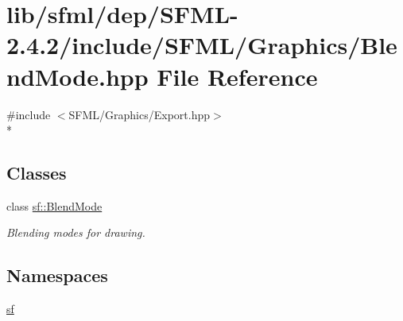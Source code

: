 \hypertarget{sfml_2dep_2_s_f_m_l-2_84_82_2include_2_s_f_m_l_2_graphics_2_blend_mode_8hpp}{\section{lib/sfml/dep/\-S\-F\-M\-L-\/2.4.2/include/\-S\-F\-M\-L/\-Graphics/\-Blend\-Mode.hpp File Reference}
\label{sfml_2dep_2_s_f_m_l-2_84_82_2include_2_s_f_m_l_2_graphics_2_blend_mode_8hpp}
}
{\ttfamily \#include $<$S\-F\-M\-L/\-Graphics/\-Export.\-hpp$>$}\\*
\subsection*{Classes}
\begin{DoxyCompactItemize}
\item 
class \hyperlink{structsf_1_1_blend_mode}{sf\-::\-Blend\-Mode}
\begin{DoxyCompactList}\small\item\em Blending modes for drawing. \end{DoxyCompactList}\end{DoxyCompactItemize}
\subsection*{Namespaces}
\begin{DoxyCompactItemize}
\item 
\hyperlink{namespacesf}{sf}
\end{DoxyCompactItemize}

